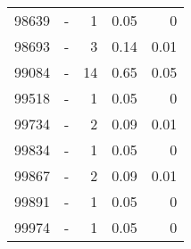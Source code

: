 \begin{longtable}{lXrrr}
        98639 & \multicolumn{1}{X}{-} & %
          \num{1} &
          \num[round-mode=places,round-precision=2]{0,05} &
          \num[round-mode=places,round-precision=2]{0} \\

        98693 & \multicolumn{1}{X}{-} & %
          \num{3} &
          \num[round-mode=places,round-precision=2]{0,14} &
          \num[round-mode=places,round-precision=2]{0,01} \\

        99084 & \multicolumn{1}{X}{-} & %
          \num{14} &
          \num[round-mode=places,round-precision=2]{0,65} &
          \num[round-mode=places,round-precision=2]{0,05} \\

        99518 & \multicolumn{1}{X}{-} & %
          \num{1} &
          \num[round-mode=places,round-precision=2]{0,05} &
          \num[round-mode=places,round-precision=2]{0} \\

        99734 & \multicolumn{1}{X}{-} & %
          \num{2} &
          \num[round-mode=places,round-precision=2]{0,09} &
          \num[round-mode=places,round-precision=2]{0,01} \\

        99834 & \multicolumn{1}{X}{-} & %
          \num{1} &
          \num[round-mode=places,round-precision=2]{0,05} &
          \num[round-mode=places,round-precision=2]{0} \\

        99867 & \multicolumn{1}{X}{-} & %
          \num{2} &
          \num[round-mode=places,round-precision=2]{0,09} &
          \num[round-mode=places,round-precision=2]{0,01} \\

        99891 & \multicolumn{1}{X}{-} & %
          \num{1} &
          \num[round-mode=places,round-precision=2]{0,05} &
          \num[round-mode=places,round-precision=2]{0} \\

        99974 & \multicolumn{1}{X}{-} & %
          \num{1} &
          \num[round-mode=places,round-precision=2]{0,05} &
          \num[round-mode=places,round-precision=2]{0} \\


\end{longtable}
